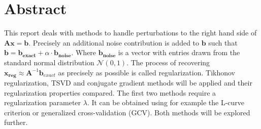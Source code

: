 \section{Abstract}
This report deals with methods to handle perturbations to the right hand side of $\mathbf{Ax} = \mathbf{b}$. Precisely an additional noise contribution is added to $\mathbf{b}$ such that $\mathbf{b} = \mathbf{b_{exact}} + \alpha \cdot \mathbf{b_{noise}}$. Where $\mathbf{b_{noise}}$ is a vector with entries drawn from the standard normal distribution $\mathcal{N}(0,1)$. 
The process of recovering $\mathbf{x_{reg}} \approx \mathbf{A}^{-1} \mathbf{b}_{exact}$ as precisely as possible is called regularization. Tikhonov regularization, TSVD and conjugate gradient methods will be applied and their regularization properties compared.
The first two methods require a regularization parameter $\lambda$. It can be obtained using for example the L-curve criterion or generalized cross-validation (GCV). Both methods will be explored further.

